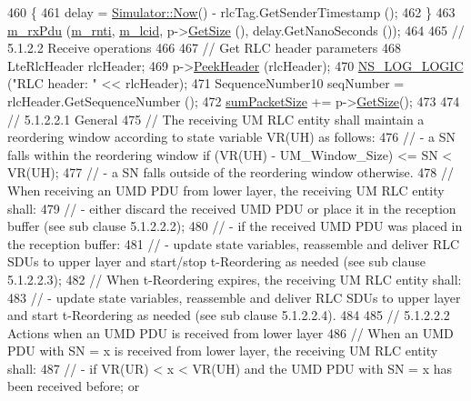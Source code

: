 \begin{DoxyCode}
460     \{
461       delay = \hyperlink{classns3_1_1Simulator_ac3178fa975b419f7875e7105be122800}{Simulator::Now}() - rlcTag.GetSenderTimestamp ();
462     \}
463   \hyperlink{classns3_1_1LteRlc_a5a2491726597ab3cb02655b34dca0722}{m\_rxPdu} (\hyperlink{classns3_1_1LteRlc_a48ab0a78e7f2687337075b1c8832df70}{m\_rnti}, \hyperlink{classns3_1_1LteRlc_a051085e9b27883e7ba4b98ad7242fd8a}{m\_lcid}, p->\hyperlink{classns3_1_1Packet_a462855c9929954d4301a4edfe55f4f1c}{GetSize} (), delay.GetNanoSeconds ());
464 
465   \textcolor{comment}{// 5.1.2.2 Receive operations}
466 
467   \textcolor{comment}{// Get RLC header parameters}
468   LteRlcHeader rlcHeader;
469   p->\hyperlink{classns3_1_1Packet_aadc63487bea70945c418f4c3e9b81964}{PeekHeader} (rlcHeader);
470   \hyperlink{group__logging_ga88acd260151caf2db9c0fc84997f45ce}{NS\_LOG\_LOGIC} (\textcolor{stringliteral}{"RLC header: "} << rlcHeader);
471   SequenceNumber10 seqNumber = rlcHeader.GetSequenceNumber ();
472   \hyperlink{classns3_1_1LteRlcUm_aa873d03add0bb0b7d5a9ac3224685fd2}{sumPacketSize} += p->\hyperlink{classns3_1_1Packet_a462855c9929954d4301a4edfe55f4f1c}{GetSize}();
473 
474   \textcolor{comment}{// 5.1.2.2.1 General}
475   \textcolor{comment}{// The receiving UM RLC entity shall maintain a reordering window according to state variable VR(UH) as
       follows:}
476   \textcolor{comment}{// - a SN falls within the reordering window if (VR(UH) - UM\_Window\_Size) <= SN < VR(UH);}
477   \textcolor{comment}{// - a SN falls outside of the reordering window otherwise.}
478   \textcolor{comment}{// When receiving an UMD PDU from lower layer, the receiving UM RLC entity shall:}
479   \textcolor{comment}{// - either discard the received UMD PDU or place it in the reception buffer (see sub clause 5.1.2.2.2);}
480   \textcolor{comment}{// - if the received UMD PDU was placed in the reception buffer:}
481   \textcolor{comment}{// - update state variables, reassemble and deliver RLC SDUs to upper layer and start/stop t-Reordering
       as needed (see sub clause 5.1.2.2.3);}
482   \textcolor{comment}{// When t-Reordering expires, the receiving UM RLC entity shall:}
483   \textcolor{comment}{// - update state variables, reassemble and deliver RLC SDUs to upper layer and start t-Reordering as
       needed (see sub clause 5.1.2.2.4).}
484 
485   \textcolor{comment}{// 5.1.2.2.2 Actions when an UMD PDU is received from lower layer}
486   \textcolor{comment}{// When an UMD PDU with SN = x is received from lower layer, the receiving UM RLC entity shall:}
487   \textcolor{comment}{// - if VR(UR) < x < VR(UH) and the UMD PDU with SN = x has been received before; or}

\end{DoxyCode}
